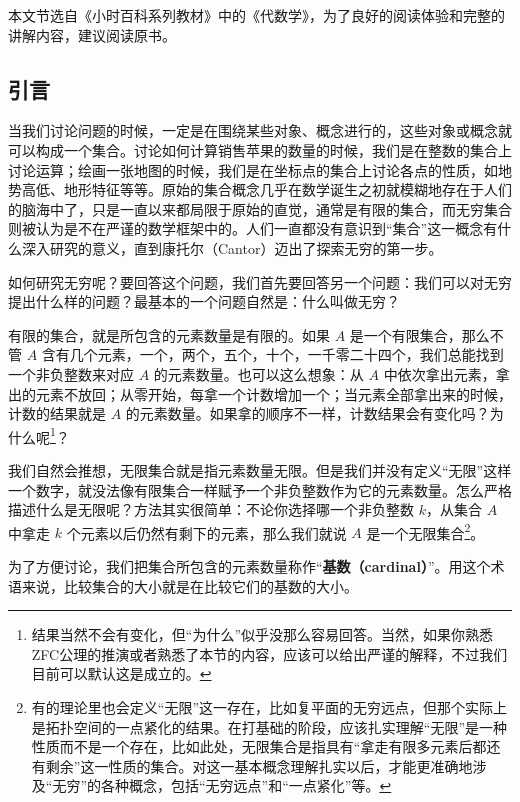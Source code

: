 

本文节选自《小时百科系列教材》中的《代数学》，为了良好的阅读体验和完整的讲解内容，建议阅读原书。

\subsection{引言}

当我们讨论问题的时候，一定是在围绕某些对象、概念进行的，这些对象或概念就可以构成一个集合。讨论如何计算销售苹果的数量的时候，我们是在整数的集合上讨论运算；绘画一张地图的时候，我们是在坐标点的集合上讨论各点的性质，如地势高低、地形特征等等。原始的集合概念几乎在数学诞生之初就模糊地存在于人们的脑海中了，只是一直以来都局限于原始的直觉，通常是有限的集合，而无穷集合则被认为是不在严谨的数学框架中的。人们一直都没有意识到“集合”这一概念有什么深入研究的意义，直到康托尔（Cantor）迈出了探索无穷的第一步。

如何研究无穷呢？要回答这个问题，我们首先要回答另一个问题：我们可以对无穷提出什么样的问题？最基本的一个问题自然是：什么叫做无穷？

有限的集合，就是所包含的元素数量是有限的。如果 $A$ 是一个有限集合，那么不管 $A$ 含有几个元素，一个，两个，五个，十个，一千零二十四个，我们总能找到一个非负整数来对应 $A$ 的元素数量。也可以这么想象：从 $A$ 中依次拿出元素，拿出的元素不放回；从零开始，每拿一个计数增加一个；当元素全部拿出来的时候，计数的结果就是 $A$ 的元素数量。如果拿的顺序不一样，计数结果会有变化吗？为什么呢\footnote{结果当然不会有变化，但“为什么”似乎没那么容易回答。当然，如果你熟悉ZFC公理的推演或者熟悉了本节的内容，应该可以给出严谨的解释，不过我们目前可以默认这是成立的。}？

我们自然会推想，无限集合就是指元素数量无限。但是我们并没有定义“无限”这样一个数字，就没法像有限集合一样赋予一个非负整数作为它的元素数量。怎么严格描述什么是无限呢？方法其实很简单：不论你选择哪一个非负整数 $k$，从集合 $A$ 中拿走 $k$ 个元素以后仍然有剩下的元素，那么我们就说 $A$ 是一个无限集合\footnote{有的理论里也会定义“无限”这一存在，比如复平面的无穷远点，但那个实际上是拓扑空间的一点紧化的结果。在打基础的阶段，应该扎实理解“无限”是一种性质而不是一个存在，比如此处，无限集合是指具有“拿走有限多元素后都还有剩余”这一性质的集合。对这一基本概念理解扎实以后，才能更准确地涉及“无穷”的各种概念，包括“无穷远点”和“一点紧化”等。}。

为了方便讨论，我们把集合所包含的元素数量称作“\textbf{基数（cardinal）}”。用这个术语来说，比较集合的大小就是在比较它们的基数的大小。

